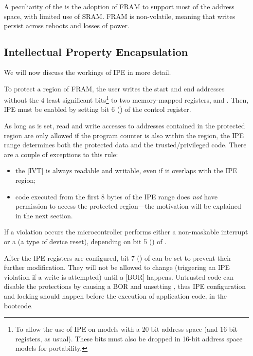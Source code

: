 A peculiarity of the \msp is the adoption of FRAM \cite{slaa628b} to support most of the address space, with limited use of SRAM. FRAM is non-volatile, meaning that writes persist across reboots and losses of power.

\subsection{Intellectual Property Encapsulation}
\label{sec:ipe}

We will now discuss the workings of IPE in more detail.

To protect a region of FRAM, the user writes the start and end addresses without the 4 least significant bits\footnote{To allow the use of IPE on models with a 20-bit address space (and 16-bit registers, as usual). These bits must also be dropped in 16-bit address space models for portability.} to two memory-mapped registers,  and . Then, IPE must be enabled by setting bit 6 () of the  control register.

As long as  is set, read and write accesses to addresses contained in the protected region are only allowed if the program counter is also within the region, \ie the IPE range determines both the protected data and the trusted/privileged code. There are a couple of exceptions to this rule:
\begin{itemize}
\item the [IVT] is always readable and writable, even if it overlaps with the IPE region; %
\item code executed from the first 8 bytes of the IPE range does \emph{not} have permission to access the protected region---the motivation will be explained in the next section.
\end{itemize}

If a violation occurs the microcontroller performs either a non-maskable interrupt or a  (a type of device reset), depending on bit 5 () of .

After the IPE registers are configured, bit 7 () of  can be set to prevent their further modification. They will not be allowed to change (triggering an IPE violation if a write is attempted) until a [BOR] happens.
Untrusted code can disable the protections by causing a BOR and unsetting , thus IPE configuration and locking should happen before the execution of application code, \ie in the bootcode.

